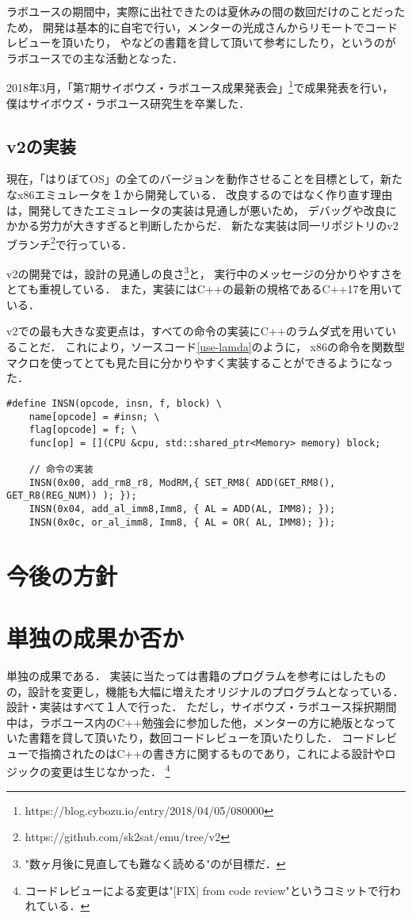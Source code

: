 \documentclass[10pt,a4j]{jsarticle}
\begin{document}
ラボユースの期間中，実際に出社できたのは夏休みの間の数回だけのことだったため，
開発は基本的に自宅で行い，メンターの光成さんからリモートでコードレビューを頂いたり，
\cite{read-486}や\cite{effective-cpp}などの書籍を貸して頂いて参考にしたり，というのがラボユースでの主な活動となった．


2018年3月，「第7期サイボウズ・ラボユース成果発表会」\footnote{https://blog.cybozu.io/entry/2018/04/05/080000}で成果発表を行い，
僕はサイボウズ・ラボユース研究生を卒業した．

\subsection{v2の実装}

現在，「はりぼてOS」の全てのバージョンを動作させることを目標として，新たなx86エミュレータを１から開発している．
改良するのではなく作り直す理由は，開発してきたエミュレータの実装は見通しが悪いため，
デバッグや改良にかかる労力が大きすぎると判断したからだ．
新たな実装は同一リポジトリのv2ブランチ\footnote{https://github.com/sk2sat/emu/tree/v2}で行っている．

v2の開発では，設計の見通しの良さ\footnote{"数ヶ月後に見直しても難なく読める"のが目標だ．}と，
実行中のメッセージの分かりやすさをとても重視している．
また，実装にはC++の最新の規格であるC++17を用いている．

v2での最も大きな変更点は，すべての命令の実装にC++のラムダ式を用いていることだ．
これにより，ソースコード\ref{use-lamda}のように，
x86の命令を関数型マクロを使ってとても見た目に分かりやすく実装することができるようになった．

\begin{lstlisting}[caption=ラムダ式を使った命令の実装の一部,label=use-lamda]
#define INSN(opcode, insn, f, block) \
	name[opcode] = #insn; \
	flag[opcode] = f; \
	func[op] = [](CPU &cpu, std::shared_ptr<Memory> memory) block;

	// 命令の実装
	INSN(0x00, add_rm8_r8, ModRM,{ SET_RM8( ADD(GET_RM8(), GET_R8(REG_NUM)) ); });
	INSN(0x04, add_al_imm8,Imm8, { AL = ADD(AL, IMM8); });
	INSN(0x0c, or_al_imm8, Imm8, { AL = OR( AL, IMM8); });
\end{lstlisting}

\section{今後の方針}


\section{単独の成果か否か}
単独の成果である．
実装に当たっては書籍\cite{learn-x86-by-emu}のプログラムを参考にはしたものの，設計を変更し，機能も大幅に増えたオリジナルのプログラムとなっている．
設計・実装はすべて１人で行った．
ただし，サイボウズ・ラボユース採択期間中は，ラボユース内のC++勉強会に参加した他，メンターの方に絶版となっていた書籍\cite{read-486}を貸して頂いたり，数回コードレビューを頂いたりした．
コードレビューで指摘されたのはC++の書き方に関するものであり，これによる設計やロジックの変更は生じなかった．
\footnote{コードレビューによる変更は"[FIX] from code review"というコミットで行われている．}
\end{document}
